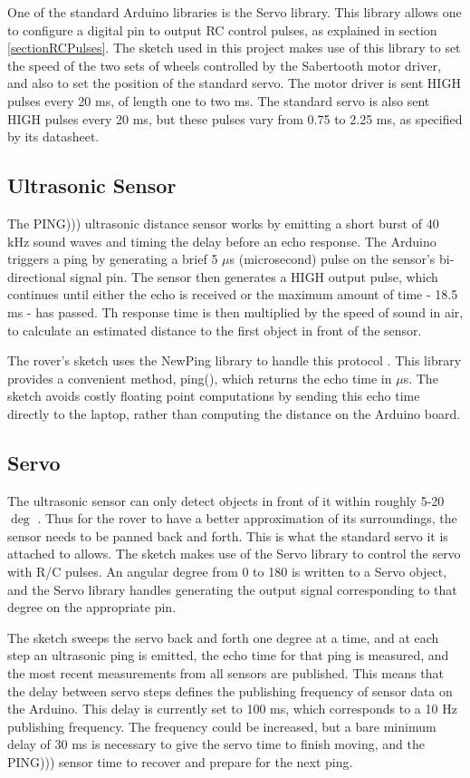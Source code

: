 One of the standard Arduino libraries is the Servo library. This library allows one to configure a digital pin to output RC control pulses, as explained in section \ref{sectionRCPulses}. The sketch used in this project makes use of this library to set the speed of the two sets of wheels controlled by the Sabertooth motor driver, and also to set the position of the standard servo. The motor driver is sent HIGH pulses every 20 ms, of length one to two ms. The standard servo is also sent HIGH pulses every 20 ms, but these pulses vary from 0.75 to 2.25 ms, as specified by its datasheet.

\subsection{Ultrasonic Sensor}
The PING))) ultrasonic distance sensor works by emitting a short burst of 40 kHz sound waves and timing the delay before an echo response. The Arduino triggers a ping by generating a brief 5 \(\mu\)s (microsecond) pulse on the sensor's bi-directional signal pin. The sensor then generates a HIGH output pulse, which continues until either the echo is received or the maximum amount of time - 18.5 ms - has passed. Th response time is then multiplied by the speed of sound in air, to calculate an estimated distance to the first object in front of the sensor. \cite{pingDocumentation}

The rover's sketch uses the NewPing library to handle this protocol \cite{newPing}. This library provides a convenient method, ping(), which returns the echo time in \(\mu\)s. The sketch avoids costly floating point computations by sending this echo time directly to the laptop, rather than computing the distance on the Arduino board.

\subsection{Servo}
The ultrasonic sensor can only detect objects in front of it within roughly  5-20\(\deg\) \cite{pingDocumentation}. Thus for the rover to have a better approximation of its surroundings, the sensor needs to be panned back and forth. This is what the standard servo it is attached to allows. The sketch makes use of the Servo library to control the servo with R/C pulses. An angular degree from 0 to 180 is written to a Servo object, and the Servo library handles generating the output signal corresponding to that degree on the appropriate pin.

The sketch sweeps the servo back and forth one degree at a time, and at each step an ultrasonic ping is emitted, the echo time for that ping is measured, and the most recent measurements from all sensors are published. This means that the delay between servo steps defines the publishing frequency of sensor data on the Arduino. This delay is currently set to 100 ms, which corresponds to a 10 Hz publishing frequency. The frequency could be increased, but a bare minimum delay of 30 ms is necessary to give the servo time to finish moving, and the PING))) sensor time to recover and prepare for the next ping.

